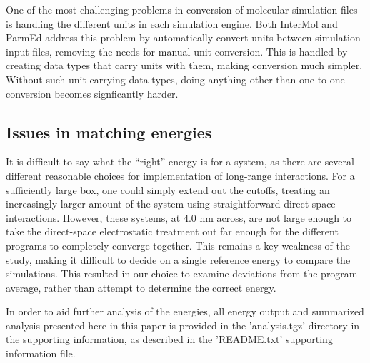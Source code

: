 One of the most challenging problems in conversion of molecular
 simulation files is handling the different units in each simulation
 engine. Both InterMol and ParmEd address this problem by
 automatically convert units between simulation input files, removing
 the needs for manual unit conversion. This is handled by creating
 data types that carry units with them, making conversion much
 simpler.  Without such unit-carrying data types, doing anything other
 than one-to-one conversion becomes signficantly harder.

\subsection*{Issues in matching energies}

It is difficult to say what the ``right'' energy is for a system, as
there are several different reasonable choices for implementation of
long-range interactions. For a sufficiently large box, one could
simply extend out the cutoffs, treating an increasingly larger amount
of the system using straightforward direct space interactions.
However, these systems, at 4.0 nm across, are not large enough to take
the direct-space electrostatic treatment out far enough for the
different programs to completely converge together.  This remains a
key weakness of the study, making it difficult to decide on a single
reference energy to compare the simulations. This resulted in our
choice to examine deviations from the program average, rather than
attempt to determine the correct energy. 

In order to aid further analysis of the energies, all energy output
and summarized analysis presented here in this paper is provided in
the 'analysis.tgz' directory in the supporting information, as
described in the 'README.txt' supporting information file.


